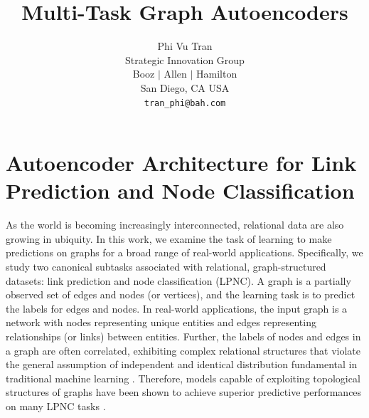 \documentclass{article}
\title{Multi-Task Graph Autoencoders}
\author{
  Phi Vu Tran\\
  Strategic Innovation Group\\
  Booz $\vert$ Allen $\vert$ Hamilton\\
  San Diego, CA USA\\
  \texttt{tran\_phi@bah.com}\\
}
\begin{document}

\maketitle


\section{Autoencoder Architecture for Link Prediction and Node Classification}

As the world is becoming increasingly interconnected, relational data are also growing in ubiquity. In this work, we examine the task of learning to make predictions on graphs for a broad range of real-world applications. Specifically, we study two canonical subtasks associated with relational, graph-structured datasets: link prediction and node classification (LPNC). A graph is a partially observed set of edges and nodes (or vertices), and the learning task is to predict the labels for edges and nodes. In real-world applications, the input graph is a network with nodes representing unique entities and edges representing relationships (or links) between entities. Further, the labels of nodes and edges in a graph are often correlated, exhibiting complex relational structures that violate the general assumption of independent and identical distribution fundamental in traditional machine learning \cite{Hassan:2010}. Therefore, models capable of exploiting topological structures of graphs have been shown to achieve superior predictive performances on many LPNC tasks \cite{Rossi:2012}.
\end{document}

